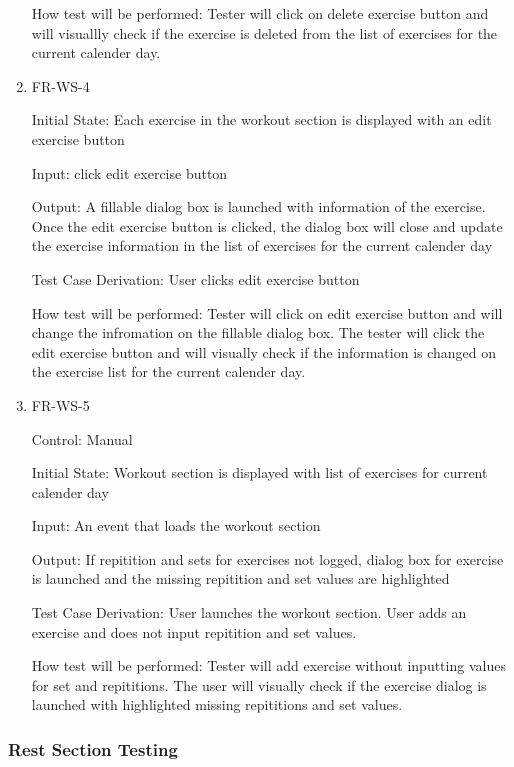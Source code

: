 \documentclass[12pt, titlepage]{article}
\begin{document}
\begin{enumerate}
How test will be performed: Tester will click on delete exercise button and will visuallly check if the exercise is deleted from the list of exercises for the current calender day. 

\item{FR-WS-4\\}

Initial State: Each exercise in the workout section is displayed with an edit exercise button
					
Input: click edit exercise button
					
Output: A fillable dialog box is launched with information of the exercise. Once the edit exercise button is clicked, the dialog box will close and update the exercise information in the list of exercises for the current calender day

Test Case Derivation: User clicks edit exercise button

How test will be performed: Tester will click on edit exercise button and will change the infromation on the fillable dialog box. The tester will click the edit exercise button and will visually check if the information is changed on the exercise list for the current calender day.

\item{FR-WS-5\\}

Control: Manual
					
Initial State: Workout section is displayed with list of exercises for current calender day
					
Input: An event that loads the workout section
					
Output: If repitition and sets for exercises not logged, dialog box for exercise is launched and the missing repitition and set values are highlighted

Test Case Derivation: User launches the workout section. User adds an exercise and does not input repitition and set values.

How test will be performed: Tester will add exercise without inputting values for set and repititions. The user will visually check if the exercise dialog is launched with highlighted missing repititions and set values.

\end{enumerate}


\subsubsection{Rest Section Testing}
\end{document}
